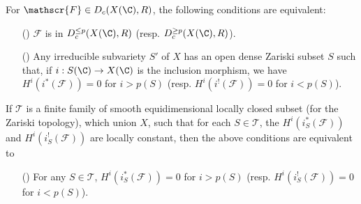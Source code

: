 \begin{proposition}\label{triangle cat perverse sheaf over scheme D^p char}
For $\mathscr{F}\in D_c(X(\C),R)$, the following conditions are equivalent:
\begin{enumerate}
    \item[(\rmnum{1})] $\mathscr{F}$ is in $D_c^{\leq p}(X(\C),R)$ (resp. $D_c^{\geq p}(X(\C),R)$).
    \item[(\rmnum{2})] Any irreducible subvariety $S'$ of $X$ has an open dense Zariski subset $S$ such that, if $i:S(\C)\to X(\C)$ is the inclusion morphism, we have $H^i(i^*(\mathscr{F}))=0$ for $i>p(S)$ (resp. $H^i(i^!(\mathscr{F}))=0$ for $i<p(S)$).
\end{enumerate}
If $\mathcal{T}$ is a finite family of smooth equidimensional locally closed subset (for the Zariski topology), which union $X$, such that for each $S\in\mathcal{T}$, the $H^i(i_S^*(\mathscr{F}))$ and $H^i(i_S^!(\mathscr{F}))$ are locally constant, then the above conditions are equivalent to
\begin{enumerate}
    \item[(\rmnum{3})] For any $S\in\mathcal{T}$, $H^i(i_S^*(\mathscr{F}))=0$ for $i>p(S)$ (resp. $H^i(i_S^!(\mathscr{F}))=0$ for $i<p(S)$).
\end{enumerate}
\end{proposition}
